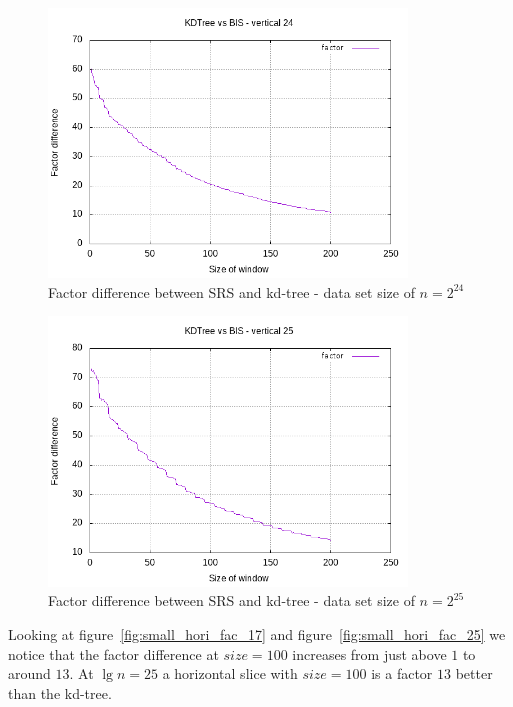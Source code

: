 \begin{figure}[h]
    \centering
    \includegraphics[width = 0.85\textwidth]{pictures/analysis/smalls/vert_fac_24.png}
    \caption{Factor difference between SRS and kd-tree - data set size of $n=2^{24}$}\label{fig:small_vert_fac_24}
\end{figure}

\begin{figure}[h]
    \centering
    \includegraphics[width = 0.85\textwidth]{pictures/analysis/smalls/vert_fac_25.png}
    \caption{Factor difference between SRS and kd-tree - data set size of $n=2^{25}$}\label{fig:small_vert_fac_25}
\end{figure}
\clearpage

Looking at figure~\ref{fig:small_hori_fac_17} and figure~\ref{fig:small_hori_fac_25} we notice that the factor difference at $size=100$ increases from just above $1$ to around $13$. At $\lg n = 25$ a horizontal slice with $size = 100$ is a factor $13$ better than the kd-tree. 

